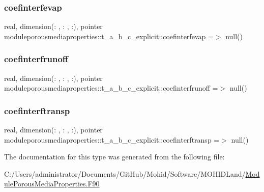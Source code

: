 \subsubsection{\texorpdfstring{coefinterfevap}{coefinterfevap}}
{\footnotesize\ttfamily real, dimension(\+: , \+: , \+:), pointer moduleporousmediaproperties\+::t\+\_\+a\+\_\+b\+\_\+c\+\_\+explicit\+::coefinterfevap =$>$ null()\hspace{0.3cm}{\ttfamily [private]}}

\mbox{\label{structmoduleporousmediaproperties_1_1t__a__b__c__explicit_ab1ffebabb607ff351213b61f8f1f6f5d}} 
\subsubsection{\texorpdfstring{coefinterfrunoff}{coefinterfrunoff}}
{\footnotesize\ttfamily real, dimension(\+: , \+: , \+:), pointer moduleporousmediaproperties\+::t\+\_\+a\+\_\+b\+\_\+c\+\_\+explicit\+::coefinterfrunoff =$>$ null()\hspace{0.3cm}{\ttfamily [private]}}

\mbox{\label{structmoduleporousmediaproperties_1_1t__a__b__c__explicit_a7b32a2221c4be6e82ca0eea8923bef95}} 
\subsubsection{\texorpdfstring{coefinterftransp}{coefinterftransp}}
{\footnotesize\ttfamily real, dimension(\+: , \+: , \+:), pointer moduleporousmediaproperties\+::t\+\_\+a\+\_\+b\+\_\+c\+\_\+explicit\+::coefinterftransp =$>$ null()\hspace{0.3cm}{\ttfamily [private]}}



The documentation for this type was generated from the following file\+:\begin{DoxyCompactItemize}
\item 
C\+:/\+Users/administrator/\+Documents/\+Git\+Hub/\+Mohid/\+Software/\+M\+O\+H\+I\+D\+Land/\mbox{\hyperlink{_module_porous_media_properties_8_f90}{Module\+Porous\+Media\+Properties.\+F90}}\end{DoxyCompactItemize}
